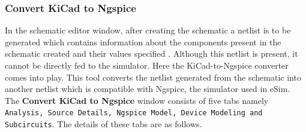 \subsubsection {Convert KiCad to Ngspice}
In the schematic editor window, after creating the schematic a netlist is to be  generated which contains information about the components present in the schematic created and their values specified . Although this netlist is present, it cannot be directly fed to the simulator. Here the KiCad-to-Ngspice converter comes into play.
This tool converts the netlist generated from the schematic into another netlist which is compatible with Ngspice, the simulator used in eSim.
The \textbf{Convert KiCad to Ngspice} window consists of five tabs namely \texttt{Analysis, Source Details, Ngspice Model, Device Modeling and Subcircuits}.
The details of these tabs are as follows.\\
